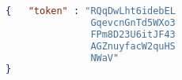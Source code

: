 \documentclass[aspectratio=0510]{beamer}
\begin{document}
    \begin{lstlisting}[language=json,firstnumber=1]
{   "token" : "RQqDwLht6idebEL
               GqevcnGnTd5WXo3
               FPm8D23U6itJF43
               AGZnuyfacW2quHS
               NWaV"
}
    \end{lstlisting}
\end{document}
